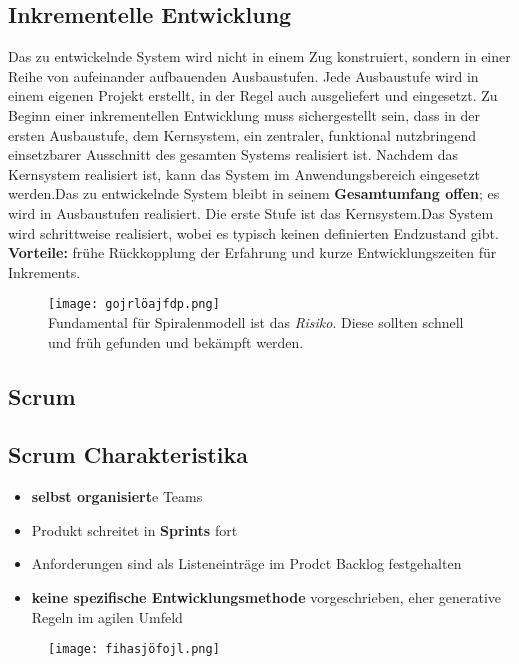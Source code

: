 \documentclass{book}
\begin{document}
    \subsection{Inkrementelle Entwicklung}
    Das zu entwickelnde System wird nicht in einem Zug konstruiert, sondern in einer Reihe von aufeinander
    aufbauenden Ausbaustufen.
    Jede Ausbaustufe wird in einem eigenen Projekt erstellt, in der Regel auch ausgeliefert und eingesetzt.
    Zu Beginn einer inkrementellen Entwicklung muss sichergestellt sein, dass in der ersten Ausbaustufe, dem
    Kernsystem, ein zentraler, funktional nutzbringend einsetzbarer Ausschnitt des gesamten Systems realisiert ist.
    Nachdem das Kernsystem realisiert ist, kann das System im Anwendungsbereich eingesetzt werden.Das zu entwickelnde System bleibt in seinem \textbf{Gesamtumfang offen}; es wird in Ausbaustufen realisiert. Die
    erste Stufe ist das Kernsystem.Das System wird schrittweise realisiert, wobei es typisch keinen definierten Endzustand gibt.
    \textbf{Vorteile:} frühe Rückkopplung der Erfahrung und kurze Entwicklungszeiten für Inkrements.
    \begin{figure}[H]
        \centering
        \texttt{[image: gojrlöajfdp.png]}
        \label{fig:enter-label}
        \\Fundamental für Spiralenmodell ist das \textit{Risiko}. Diese sollten schnell und früh gefunden und bekämpft werden.
    \end{figure}
    \subsection{Scrum}
    \subsection{Scrum Charakteristika}
    \begin{itemize}
        \item \textbf{selbst organisiert}e Teams
        \item Produkt schreitet in \textbf{Sprints} fort
        \item Anforderungen sind als Listeneinträge im Prodct Backlog festgehalten
        \item \textbf{keine spezifische Entwicklungsmethode} vorgeschrieben, eher generative  Regeln im agilen Umfeld
    \end{itemize}
    \begin{figure}[h]
        \centering
        \texttt{[image: fihasjöfojl.png]}
        \label{fig:enter-label}
    \end{figure}
\end{document}
